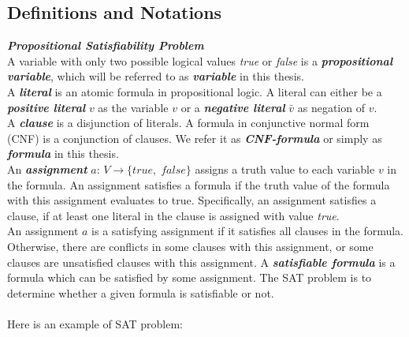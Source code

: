 \documentclass[12pt,a4paper,twoside]{scrartcl}
\numberwithin{equation}{section}
\begin{document}
\subsection{Definitions and Notations} 
\emph{\textbf{Propositional Satisfiability Problem}}\\
A variable with only two possible logical values  \textit{true} or  \textit{false} is a \emph{\textbf{propositional variable}}, which will be referred to as \emph{\textbf{variable}} in this thesis.     \\
A \emph{\textbf{literal}} is an atomic formula in propositional logic. A literal can either be a \emph{\textbf{positive literal}} $v$ as the variable $v$ or a \emph{\textbf{negative literal}} $\bar{v}$ as negation of $v$.\\
A \emph{\textbf{clause}} is a disjunction of literals. A formula in conjunctive normal form (CNF) is a conjunction of clauses. We refer it as  \emph{\textbf{CNF-formula}} or simply as \emph{\textbf{formula}} in this thesis.\\
An \emph{\textbf{assignment}} $a$: $V\rightarrow \{true {, }\; false\}$ assigns a truth value to each variable $v$ in the formula. An assignment satisfies a formula if the truth value of the formula with this assignment evaluates to true. Specifically, an assignment satisfies a clause, if at least one literal in the clause is assigned with value  \textit{true}. \\
An assignment $a$ is a satisfying assignment if it  satisfies all clauses in the formula. Otherwise, there are conflicts in some clauses with this assignment, or some clauses are unsatisfied clauses with this assignment. 
A \emph{\textbf{satisfiable formula}} is a formula which can be satisfied by some assignment. The SAT problem is to determine whether a given formula is satisfiable or not.  \\
\\
Here is an example of SAT problem:
\end{document}

